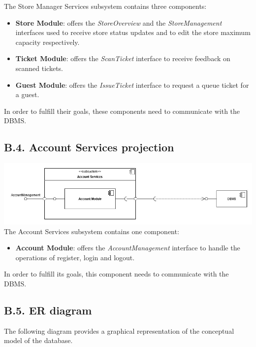 The Store Manager Services subsystem contains three components:
\begin{itemize}
\item
    \textbf{Store Module}: offers the \emph{StoreOverview} and the \emph{StoreManagement} interfaces used to receive store status updates and to edit the store maximum capacity respectively.
\item
    \textbf{Ticket Module}: offers the \emph{ScanTicket} interface to receive feedback on scanned tickets.
\item
    \textbf{Guest Module}: offers the \emph{IssueTicket} interface to request a queue ticket for a guest.
\end{itemize}

In order to fulfill their goals, these components need to communicate with the DBMS.

\clearpage
\subsection{B.4. Account Services projection}

\includegraphics{components_view/account_services_projection}
The Account Services subsystem contains one component:
\begin{itemize}
\item
    \textbf{Account Module}: offers the \emph{AccountManagement} interface to handle the operations of register, login and logout.
\end{itemize}

In order to fulfill its goals, this component needs to communicate with the DBMS.

\subsection{B.5. ER diagram}

The following diagram provides a graphical representation of the conceptual model of the database.

